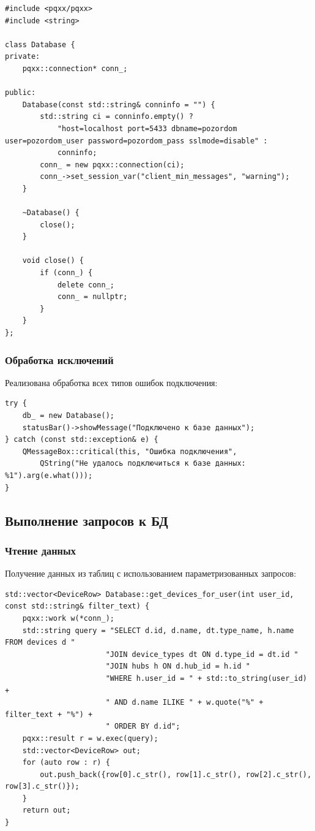 \documentclass[oneside,a4paper,14pt]{extarticle}
\begin{document}
\begin{verbatim}
#include <pqxx/pqxx>
#include <string>

class Database {
private:
    pqxx::connection* conn_;

public:
    Database(const std::string& conninfo = "") {
        std::string ci = conninfo.empty() ?
            "host=localhost port=5433 dbname=pozordom user=pozordom_user password=pozordom_pass sslmode=disable" :
            conninfo;
        conn_ = new pqxx::connection(ci);
        conn_->set_session_var("client_min_messages", "warning");
    }

    ~Database() {
        close();
    }

    void close() {
        if (conn_) {
            delete conn_;
            conn_ = nullptr;
        }
    }
};
\end{verbatim}

\subsubsection*{Обработка исключений}
\noindent Реализована обработка всех типов ошибок подключения:

\begin{verbatim}
try {
    db_ = new Database();
    statusBar()->showMessage("Подключено к базе данных");
} catch (const std::exception& e) {
    QMessageBox::critical(this, "Ошибка подключения",
        QString("Не удалось подключиться к базе данных: %1").arg(e.what()));
}
\end{verbatim}

\subsection*{Выполнение запросов к БД}

\subsubsection*{Чтение данных}
\noindent Получение данных из таблиц с использованием параметризованных запросов:

\begin{verbatim}
std::vector<DeviceRow> Database::get_devices_for_user(int user_id, const std::string& filter_text) {
    pqxx::work w(*conn_);
    std::string query = "SELECT d.id, d.name, dt.type_name, h.name FROM devices d "
                       "JOIN device_types dt ON d.type_id = dt.id "
                       "JOIN hubs h ON d.hub_id = h.id "
                       "WHERE h.user_id = " + std::to_string(user_id) +
                       " AND d.name ILIKE " + w.quote("%" + filter_text + "%") +
                       " ORDER BY d.id";
    pqxx::result r = w.exec(query);
    std::vector<DeviceRow> out;
    for (auto row : r) {
        out.push_back({row[0].c_str(), row[1].c_str(), row[2].c_str(), row[3].c_str()});
    }
    return out;
}
\end{verbatim}
\end{document}
